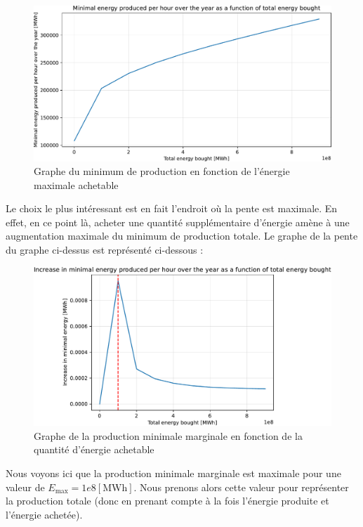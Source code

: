 \documentclass{article}
\begin{document}
\begin{figure}[h!]
    \centering
    \includegraphics[scale=0.5]{Images/Partie_1/Q2/minimal_energy_produced.pdf}
    \caption{Graphe du minimum de production en fonction de l'énergie maximale achetable}
    \label{fig:minimal_energy_produced_Q2}
\end{figure}
\noindent

Le choix le plus intéressant est en fait l'endroit où la pente est maximale. En effet, en ce point là, acheter une quantité supplémentaire d'énergie amène à une augmentation maximale du minimum de production totale. Le graphe de la pente du graphe ci-dessus est représenté ci-dessous :

\begin{figure}[h!]
    \centering
    \includegraphics[scale=0.5]{Images/Partie_1/Q2/increase_minimal_energy_produced.pdf}
    \caption{Graphe de la production minimale marginale en fonction de la quantité d'énergie achetable}
    \label{fig:increase_minimal_production_Q2}
\end{figure}

\pagebreak

Nous voyons ici que la production minimale marginale est maximale pour une valeur de $E_{\text{max}} = 1e8 [\mathrm{MWh}]$.
Nous prenons alors cette valeur pour représenter la production totale (donc en prenant compte à la fois l'énergie produite et l'énergie achetée). 
\end{document}
